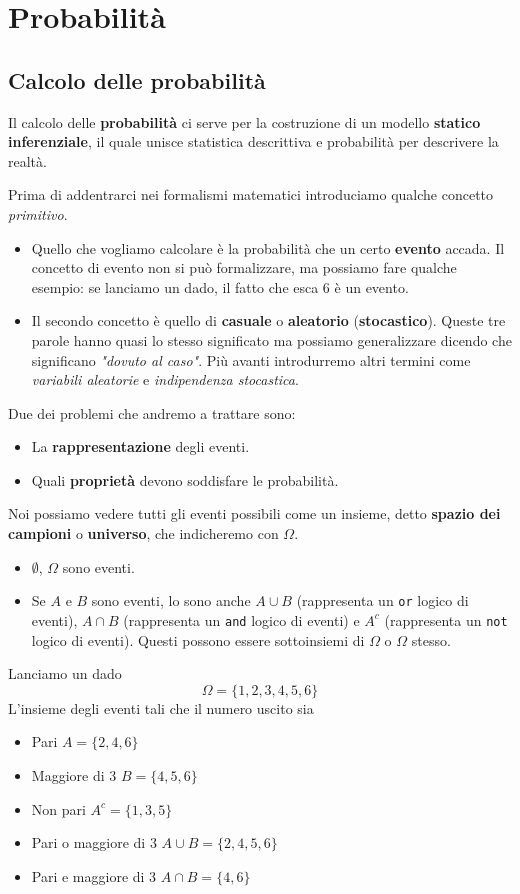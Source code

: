 \part{Probabilità}

\chapter{Calcolo delle probabilità}
Il calcolo delle \textbf{probabilità} ci serve per la costruzione di un modello
\textbf{statico inferenziale}, il quale unisce statistica descrittiva e probabilità per descrivere la
realtà.

Prima di addentrarci nei formalismi matematici introduciamo qualche concetto \emph{primitivo}.
\begin{itemize}
	\item Quello che vogliamo calcolare è la probabilità che un certo \textbf{evento} accada. Il concetto
	      di evento non si può formalizzare, ma possiamo fare qualche esempio: se lanciamo un dado, il
	      fatto che esca 6 è un evento.
	\item Il secondo concetto è quello di \textbf{casuale} o \textbf{aleatorio} (\textbf{stocastico}).
	      Queste tre parole hanno quasi lo stesso significato ma possiamo generalizzare dicendo che
	      significano \emph{"dovuto al caso"}. Più avanti introdurremo altri termini come
	      \emph{variabili aleatorie} e \emph{indipendenza stocastica}.
\end{itemize}
Due dei problemi che andremo a trattare sono:
\begin{itemize}
	\item La \textbf{rappresentazione} degli eventi.
	\item Quali \textbf{proprietà} devono soddisfare le probabilità.
\end{itemize}
Noi possiamo vedere tutti gli eventi possibili come un insieme, detto \textbf{spazio dei campioni} o
\textbf{universo}, che indicheremo con $\Omega$.
\begin{itemize}
	\item $\emptyset$, $\Omega$ sono eventi.
	\item Se $A$ e $B$ sono eventi, lo sono anche $A \cup B$ (rappresenta un \verb|or| logico di eventi),
	      $A \cap B$ (rappresenta un \verb|and| logico di eventi) e $A^c$ (rappresenta un \verb|not| logico
	      di eventi). Questi possono essere sottoinsiemi di $\Omega$ o $\Omega$ stesso.
\end{itemize}

\begin{example}
	Lanciamo un dado
	\[ \Omega = \{ 1, 2, 3, 4, 5, 6 \} \]
	L'insieme degli eventi tali che il numero uscito sia
	\begin{itemize}
		\item Pari $A = \{ 2, 4, 6 \}$
		\item Maggiore di 3 $B = \{ 4, 5, 6 \}$
		\item Non pari $A^c = \{ 1, 3, 5 \}$
		\item Pari o maggiore di 3 $A \cup B = \{ 2, 4, 5, 6 \}$
		\item Pari e maggiore di 3 $A \cap B = \{ 4, 6 \}$
	\end{itemize}
\end{example}

